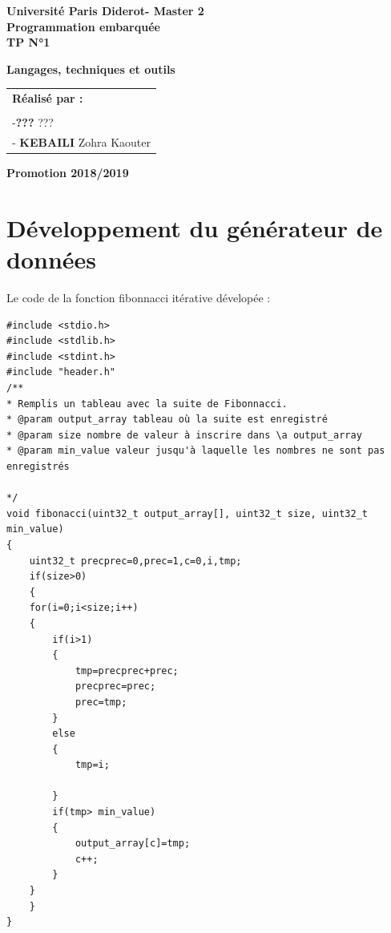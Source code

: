 \documentclass[12pt,a4paper]{article}
\begin{document}
\begin{center}

 
  
 
   \large
  	\vspace{2cm}
  \textbf{Université Paris Diderot- Master 2}\\
  \vspace{1cm}
  \LARGE
  \textbf{Programmation embarquée}\\
   \vspace*{1cm}
\LARGE
  \textbf{TP N°1}
 
  \large
  \LARGE
  \setlength{\fboxsep}{0.5cm}
  \begin{framed}
	\textbf{Langages, techniques et outils}
  \end{framed}
  \vspace{2cm}
\begin{table}[H]
   \setlength{\tabcolsep}{2cm}
    \large
	\centering
	\begin{tabular}{l}
		\textbf{Réalisé par :}    
		 \\  \\
		 -\textbf{???} ???\\
		- \textbf{ KEBAILI } Zohra Kaouter\\
	
	
		
  

	\end{tabular}
  \end{table}
  \vspace{\fill}
  \large
  \textbf{Promotion 2018/2019}
   \end{center}
\newpage
\section{Développement du générateur de données}
Le code de la fonction fibonnacci itérative dévelopée :
\begin{verbatim}
#include <stdio.h>
#include <stdlib.h>
#include <stdint.h>
#include "header.h"
/**
* Remplis un tableau avec la suite de Fibonnacci.
* @param output_array tableau où la suite est enregistré
* @param size nombre de valeur à inscrire dans \a output_array
* @param min_value valeur jusqu'à laquelle les nombres ne sont pas enregistrés

*/
void fibonacci(uint32_t output_array[], uint32_t size, uint32_t min_value)
{
	uint32_t precprec=0,prec=1,c=0,i,tmp;
	if(size>0)
	{
	for(i=0;i<size;i++)
	{
		if(i>1)
		{
			tmp=precprec+prec;
			precprec=prec;
			prec=tmp;
		}
		else
		{
			tmp=i;

		}
		if(tmp> min_value)
		{
			output_array[c]=tmp;
			c++;
		}
	}
	}
}

\end{verbatim}
\end{document}
